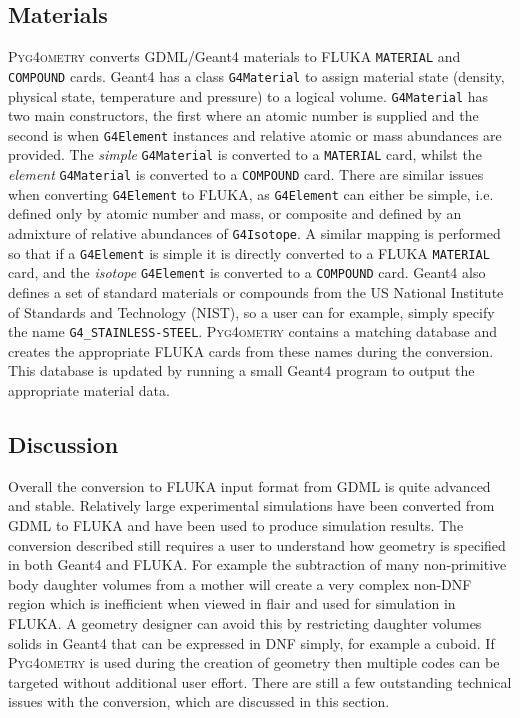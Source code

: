 \documentclass[final,5p,times,twocolumn]{elsarticle}
\newcommand{\pyinline}[1]{\lstinline[postbreak={}]{#1}}
\newcommand{\cpinline}[1]{\lstinline[postbreak={}]{#1}}
\newcommand{\fluka}[1]{\texttt{\MakeUppercase{#1}}}
\newcommand{\PYGEOMETRY}{\textsc{Pyg4ometry}}
\begin{document}
\subsection{Materials}
\PYGEOMETRY{} converts GDML/Geant4 materials to FLUKA \verb|MATERIAL| and \verb|COMPOUND| cards.
Geant4 has a class \cpinline{G4Material} to assign material state (density, physical state, temperature and pressure) 
to a logical volume. \cpinline{G4Material} has two main constructors, the first where an atomic number is supplied and 
the second is when \cpinline{G4Element} instances and relative atomic or mass abundances are provided. The {\em simple}
\cpinline{G4Material} is converted to a \fluka{material} card, whilst the {\em element} \cpinline{G4Material}  is converted to a 
\fluka{compound} card. There are similar issues when converting \cpinline{G4Element} to FLUKA, as \cpinline{G4Element}
can either be simple, i.e. defined only by atomic number and mass, or composite and defined by an admixture of 
relative abundances of \cpinline{G4Isotope}. A similar mapping is performed so that if a \cpinline{G4Element} is simple it is 
directly converted to a FLUKA \fluka{MATERIAL} card, and the {\it isotope} \cpinline{G4Element} is converted to a \fluka{compound}
card. Geant4 also defines a set of standard materials \cite{Geant4MaterialDB} or compounds from the US National Institute 
of Standards and Technology (NIST), so a user can for example, simply
specify the name \pyinline{G4_STAINLESS-STEEL}. \PYGEOMETRY{}  contains a matching database and creates the appropriate FLUKA 
cards from these names during the conversion. This database is updated by running a small Geant4 program to output the appropriate
material data.

\subsection{Discussion}
Overall the conversion to FLUKA input format from GDML is quite 
advanced and stable. Relatively large experimental simulations 
have been converted from GDML to FLUKA and have been used to produce 
simulation results. The conversion described still requires a user to
understand how geometry is specified in both Geant4 and FLUKA. For 
example the subtraction of many non-primitive body daughter volumes from 
a mother will create a very complex non-DNF region which is inefficient when viewed in 
flair and used for simulation in FLUKA. A geometry designer can avoid this by
restricting daughter volumes solids in Geant4 that can be expressed in DNF simply,
for example a cuboid.  If \PYGEOMETRY{} is used during the creation of
 geometry then multiple codes can be targeted without additional user effort. 
There are still a few outstanding technical issues with the conversion, which are discussed 
in this section.
\end{document}
